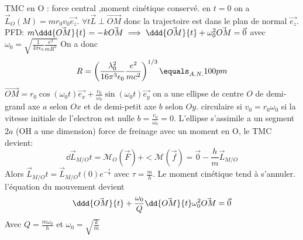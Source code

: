 \begin{Answer}
	\Question TMC en O : force central ,moment cinétique conservé. en $t=0$ on a $\vec{L}_{O}(M) = mr_0v_0\vec{e_z}$.
	$\forall t \vec{L} \perp \vec{OM}$ donc la trajectoire est dans le plan de normal $\vec{e_z}$.
	\Question PFD:
	$m\ddd{\vec{OM}}{t} =-k\vec{OM} \implies \ddd{\vec{OM}}{t} + \omega_0^2 \vec{OM} = \vec{0}$ avec $\omega_0=\sqrt{\frac{1}{4\pi\epsilon_0}\frac{e^2}{mR^3}}$
	On a donc \[R=\left(\frac{\lambda_0^2}{16\pi^3\epsilon_0}\frac{e^2}{mc^2} \right)^{1/3}\equals_{A.N.} 100 pm \]
	\Question
	$\vec{OM} = r_0\cos(\omega_0t)\vec{e_x}+\frac{v_0}{\omega_0}\sin(\omega_0t)\vec{e_y}$
	on a une ellipse de centre $O$ de demi-grand axe $a$ selon $Ox$ et de demi-petit axe $b$ selon $Oy$.
	\Question circulaire si $v_0=r_0\omega_0$ si la vitesse initiale de l'electron est nulle $b=\frac{v_0}{\omega_0}=0$. L'ellipse s'assimile a un segment $2a$ (OH a une dimension)
	\Question force de freinage avec un moment en O, le TMC devient:
	\[\dd{\vec{L}_{M/O}}{t} = \mathcal{M}_O(\vec{F})+<\mathcal{M}(\vec{f}) = \vec{0} - \frac{h}{m}\vec{L}_{M/O}
	\]
	Alors $\vec{L}_{M/O}{t} =\vec{L}_{M/O}{t}(0)e^{-\frac{t}{\tau}} $ avec $\tau=\frac{m}{h}$.
	Le moment cinétique tend à s'annuler.
	l'équation du mouvement devient
	\[\ddd{\vec{OM}}{t} + \frac{\omega_0}{Q}\dd{\vec{OM}}{t} \omega_0^2 \vec{OM} = \vec{0}\]
	Avec $Q=\frac{m\omega_0}{h}$ et $\omega_0=\sqrt{\frac{k}{m}}$
\end{Answer}
